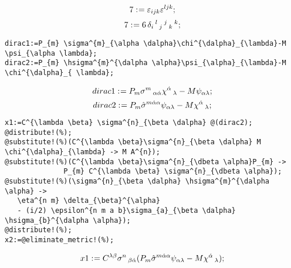 \documentclass[11pt]{article}
\def\specialcolon{\mathrel{\mathop{:}}\hspace{-.5em}}
\begin{document}
\begin{dmath*}[compact, spread=2pt]
7\specialcolon{}= {\varepsilon}_{i j k} {\varepsilon}^{l j k};
\end{dmath*}
\begin{dmath*}[compact, spread=2pt]
7\specialcolon{}= 6\, {\delta}_{i}\,^{l}\,_{j}\,^{j}\,_{k}\,^{k};
\end{dmath*}
{\color[named]{Blue}\begin{verbatim}
dirac1:=P_{m} \sigma^{m}_{\alpha \dalpha}\chi^{\dalpha}_{\lambda}-M \psi_{\alpha \lambda};
dirac2:=P_{m} \hsigma^{m}^{\dalpha \alpha}\psi_{\alpha}_{\lambda}-M \chi^{\dalpha}_{ \lambda};
\end{verbatim}}
\begin{dmath*}[compact, spread=2pt]
dirac1\specialcolon{}= {P}_{m} {\sigma}^{m}\,_{\alpha \dot{\alpha}} {\chi}^{\dot{\alpha}}\,_{\lambda} - M {\psi}_{\alpha \lambda};
\end{dmath*}
\begin{dmath*}[compact, spread=2pt]
dirac2\specialcolon{}= {P}_{m} {\hat{\sigma}}^{m \dot{\alpha} \alpha} {\psi}_{\alpha \lambda} - M {\chi}^{\dot{\alpha}}\,_{\lambda};
\end{dmath*}
{\color[named]{Blue}\begin{verbatim}
x1:=C^{\lambda \beta} \sigma^{n}_{\beta \dalpha} @(dirac2);
@distribute!(%);
@substitute!(%)(C^{\lambda \beta}\sigma^{n}_{\beta \dalpha} M \chi^{\dalpha}_{\lambda} -> M A^{n});
@substitute!(%)(C^{\lambda \beta}\sigma^{n}_{\dbeta \alpha}P_{m} -> 
              P_{m} C^{\lambda \beta} \sigma^{n}_{\dbeta \alpha});
@substitute!(%)(\sigma^{n}_{\beta \dalpha} \hsigma^{m}^{\dalpha \alpha} -> 
   \eta^{n m} \delta_{\beta}^{\alpha} 
   - (i/2) \epsilon^{n m a b}\sigma_{a}_{\beta \dalpha} \hsigma_{b}^{\dalpha \alpha});
@distribute!(%);
x2:=@eliminate_metric!(%);
\end{verbatim}}
\begin{dmath*}[compact, spread=2pt]
x1\specialcolon{}= {C}^{\lambda \beta} {\sigma}^{n}\,_{\beta \dot{\alpha}} ({P}_{m} {\hat{\sigma}}^{m \dot{\alpha} \alpha} {\psi}_{\alpha \lambda} - M {\chi}^{\dot{\alpha}}\,_{\lambda});
\end{dmath*}
\end{document}
